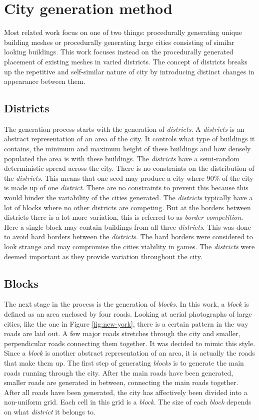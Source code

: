 \section{City generation method}
Most related work focus on one of two things: procedurally generating unique building meshes\cite{PseudoInfiniteCities} or procedurally generating large cities consisting of similar looking buildings\cite{InfiniteCities}. This work focuses instead on the procedurally generated placement of existing meshes in varied districts. The concept of districts breaks up the repetitive and self-similar nature of city by introducing distinct changes in appearance between them.

	\subsection{Districts}
	The generation process starts with the generation of \textit{districts}. A \textit{districts} is an abstract representation of an area of the city. It controls what type of buildings it contains, the minimum and maximum height of these buildings and how densely populated the area is with these buildings. The \textit{districts} have a semi-random deterministic spread across the city. There is no constraints on the distribution of the \textit{districts}. This means that one seed may produce a city where 90\% of the city is made up of one \textit{district}. There are no constraints to prevent this because this would hinder the variability of the cities generated. The \textit{districts} typically have a lot of blocks where no other districts are competing. But at the borders between districts there is a lot more variation, this is referred to as \textit{border competition}. Here a single block may contain buildings from all three \textit{districts}. This was done to avoid hard borders between the \textit{districts}. The hard borders were considered to look strange and may compromise the cities viability in games. The \textit{districts} were deemed important as they provide variation throughout the city.
		
	\subsection{Blocks}
	The next stage in the process is the generation of \textit{blocks}. In this work, a \textit{block} is defined as an area enclosed by four roads. Looking at aerial photographs of large cities, like the one in Figure \ref{fig:new-york}, there is a certain pattern in the way roads are laid out. A few major roads stretches through the city and smaller, perpendicular roads connecting them together. It was decided to mimic this style. Since a \textit{block} is another abstract representation of an area, it is actually the roads that make them up. The first step of generating \textit{blocks} is to generate the main roads running through the city. After the main roads have been generated, smaller roads are generated in between, connecting the main roads together. After all roads have been generated, the city has affectively been divided into a non-uniform grid. Each cell in this grid is a \textit{block}. The size of each \textit{block} depends on what \textit{district} it belongs to.
	
